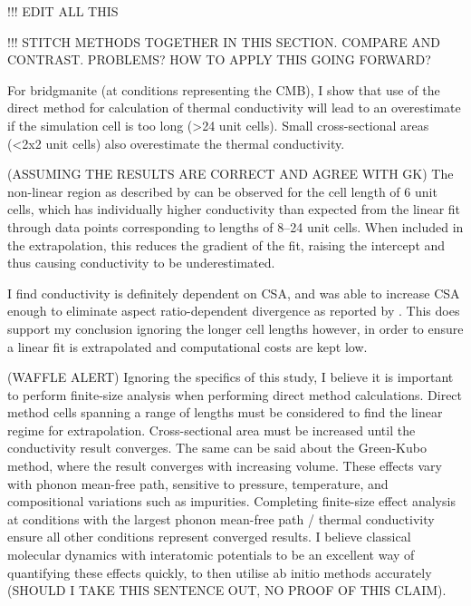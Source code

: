 !!! EDIT ALL THIS

!!! STITCH METHODS TOGETHER IN THIS SECTION. COMPARE AND CONTRAST. PROBLEMS? HOW TO APPLY THIS GOING FORWARD?

For bridgmanite (at conditions representing the CMB), I show that use of the direct method for calculation of thermal conductivity will lead to an overestimate if the simulation cell is too long (\textgreater 24 unit cells). Small cross-sectional areas (\textless 2x2 unit cells) also overestimate the thermal conductivity. %

(ASSUMING THE RESULTS ARE CORRECT AND AGREE WITH GK) The non-linear region as described by \citet{Sellan2010} can be observed for the cell length of 6 unit cells, which has individually higher conductivity than expected from the linear fit through data points corresponding to lengths of 8--24 unit cells. When included in the extrapolation, this reduces the gradient of the fit, raising the intercept and thus causing conductivity to be underestimated. %

I find conductivity is definitely dependent on CSA, and was able to increase CSA enough to eliminate aspect ratio-dependent divergence as reported by \citet{Hu2011}. This does support my conclusion ignoring the longer cell lengths however, in order to ensure a linear fit is extrapolated and computational costs are kept low. 

(WAFFLE ALERT) Ignoring the specifics of this study, I believe it is important to perform finite-size analysis when performing direct method calculations.  Direct method cells spanning a range of lengths must be considered to find the linear regime for extrapolation. Cross-sectional area must be increased until the conductivity result converges. The same can be said about the Green-Kubo method, where the result converges with increasing volume. These effects vary with phonon mean-free path, sensitive to pressure, temperature, and compositional variations such as impurities. Completing finite-size effect analysis at conditions with the largest phonon mean-free path / thermal conductivity ensure all other conditions represent converged results. I believe classical molecular dynamics with interatomic potentials to be an excellent way of quantifying these effects quickly, to then utilise ab initio methods accurately (SHOULD I TAKE THIS SENTENCE OUT, NO PROOF OF THIS CLAIM).
